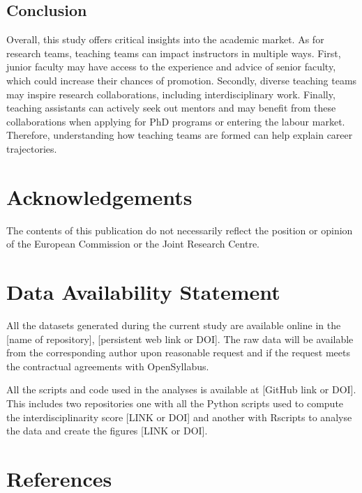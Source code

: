 \documentclass[
  british,
  11pt,
]{article}
\begin{document}
\subsection{Conclusion}\label{conclusion}

Overall, this study offers critical insights into the academic market. As for research teams, teaching teams can impact instructors in multiple ways. First, junior faculty may have access to the experience and advice of senior faculty, which could increase their chances of promotion. Secondly, diverse teaching teams may inspire research collaborations, including interdisciplinary work. Finally, teaching assistants can actively seek out mentors and may benefit from these collaborations when applying for PhD programs or entering the labour market. Therefore, understanding how teaching teams are formed can help explain career trajectories.

\clearpage
\processdelayedfloats
\clearpage

\section*{Acknowledgements}\label{acknowledgements}

The contents of this publication do not necessarily reflect the position or opinion of the European Commission or the Joint Research Centre.

\section*{Data Availability Statement}\label{data-availability-statement}

All the datasets generated during the current study are available online in the {[}name of repository{]}, {[}persistent web link or DOI{]}. The raw data will be available from the corresponding author upon reasonable request and if the request meets the contractual agreements with OpenSyllabus.

All the scripts and code used in the analyses is available at {[}GitHub link or DOI{]}. This includes two repositories one with all the Python scripts used to compute the interdisciplinarity score {[}LINK or DOI{]} and another with Rscripts to analyse the data and create the figures {[}LINK or DOI{]}.

\section*{References}\label{references}
\end{document}
